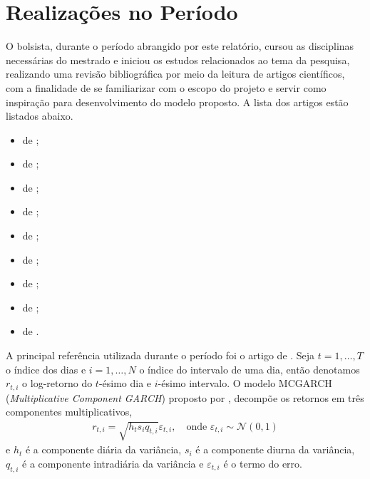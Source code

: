 \documentclass{article}
\begin{document}
\section{Realizações no Período}
O bolsista, durante o período abrangido por este relatório, cursou as disciplinas necessárias do mestrado e iniciou os estudos relacionados ao tema da pesquisa, realizando uma revisão bibliográfica por meio da leitura de artigos científicos, com a finalidade de se familiarizar com o escopo do projeto e servir como inspiração para desenvolvimento do modelo proposto. A lista dos artigos estão listados abaixo.
\begin{sloppypar}
\begin{itemize}
    \item {} de \citet{Engle_Sokalska_2012};
    \item {} de \citet{Martins_FreitasLopes_2025};
    \item {} de \citet{Ke_etal_2026};
    \item {} de \citet{Morier_VallsPereira_2025};
    \item {} de \citet{Eckernkemper_Gribisch_2021};
    \item {} de \citet{Zhang_Hua_2025};
    \item {} de \citet{Yaohao_etal_2018};
    \item {} de \citet{Andersen_etal_2019};
    \item {} de \citet{Kim_Hwang_2026}.
\end{itemize}
\end{sloppypar}

A principal referência utilizada durante o período foi o artigo  de \citet{Engle_Sokalska_2012}. Seja $t = 1, \dots, T$ o índice dos dias e $i = 1, \dots, N$ o índice do intervalo de uma dia, então denotamos $r_{t,i}$ o log-retorno do $t$-ésimo dia e $i$-ésimo intervalo. O modelo MCGARCH (\textit{Multiplicative Component GARCH}) proposto por \citet{Engle_Sokalska_2012}, decompõe os retornos em três componentes multiplicativos,
\begin{align*}
    r_{t,i} = \sqrt{h_{t} s_{i} q_{t,i}} \varepsilon_{t,i}, \quad \text{onde $\varepsilon_{t,i} \sim \mathcal{N}(0,1)$}
\end{align*}
e $h_{t}$ é a componente diária da variância, $s_{i}$ é a componente diurna da variância, $q_{t,i}$ é a componente intradiária da variância e $\varepsilon_{t,i}$ é o termo do erro.
\end{document}
